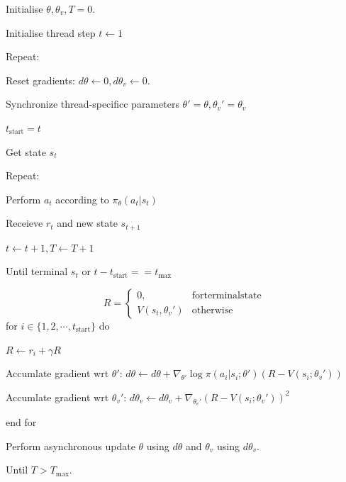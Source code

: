 \documentclass[11pt,a4paper]{article}
\begin{document}
\begin{tcolorbox}[title=A3C algorithm]
Initialise $\theta,\theta_v, T=0$.\par 
Initialise thread step $t \leftarrow 1$ \par 
Repeat:\par 
\hspace{1cm} Reset gradients: $d\theta \leftarrow 0, d\theta_v \leftarrow 0$. \par 
\hspace{1cm} Synchronize thread-specificc parameters $\theta' =\theta, \theta_v'=\theta_v$\par 
\hspace{1cm} $t_{\mathrm{start}} = t$ \par 
\hspace{1cm} Get state $s_t$ \par 
\hspace{1cm} Repeat:\par 
\hspace{2cm} Perform $a_t$ according to $\pi_{\theta}(a_t|s_t)$ \par 
\hspace{2cm} Receieve $r_t$ and new state $s_{t+1}$\par
\hspace{2cm} $t \leftarrow t+1, T \leftarrow T+1 $ \par 
\hspace{1cm} Until terminal $s_t$ or $t-t_{\mathrm{start}} == t_{\max}$ \par 
\hspace{1cm} 
\begin{equation}
    R = \left\{\begin{array}{cc}
        0, & \mathrm{for terminal state} \\ 
        V(s_t, \theta_v') & \mathrm{otherwise}
    \end{array}\right.
\end{equation}
\hspace{1cm} for $i \in \{1,2,\cdots,t_{\mathrm{start}}\}$ do\par 
\hspace{2cm} $R \leftarrow r_i + \gamma R$ \par 
\hspace{2cm} Accumlate gradient wrt $\theta'$: $d\theta \leftarrow d\theta + \nabla_{\theta'} \log \pi(a_i|s_i;\theta')(R-V(s_i;\theta_v'))$ \par 
\hspace{2cm} Accumlate gradient wrt $\theta_v'$: $d\theta_v \leftarrow d\theta_v + \nabla_{\theta_v'}(R-V(s_i;\theta_v'))^2$\par 
\hspace{1cm} end for\par 
\hspace{1cm} Perform asynchronous update $\theta$ using $d\theta$ and $\theta_v$ using $d\theta_v$. \par 
Until $T > T_{\max}$. 
\end{tcolorbox}
\end{document}
